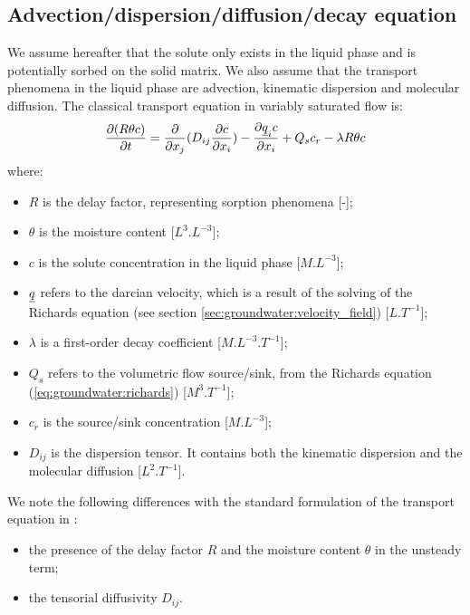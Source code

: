 \subsection{Advection/dispersion/diffusion/decay equation}
\hypertarget{gwf_sp_transp}{}
We assume hereafter that the solute only exists in the liquid phase and is
potentially sorbed on the solid matrix.
We also assume that the transport phenomena in the liquid phase are advection, kinematic dispersion and molecular diffusion.
The classical transport equation in variably saturated flow is:
\begin{equation}
\label{eq:groundwater:edv_disp_diff_ini}
\frac{\partial(R \theta c)}{\partial{t}}=\frac{\partial}{\partial x_j}(D_{ij} \frac{\partial c}{\partial x_i})-\frac{\partial \underline{q}_i c}{\partial x_i} + Q_s c_r - \lambda R \theta c
\end{equation}
where:
\begin {itemize}
 \item[$\bullet$] $R$ is the delay factor, representing sorption phenomena [-];
 \item[$\bullet$] $\theta$ is the moisture content [$L^3.L^{-3}$];
 \item[$\bullet$] $c$ is the solute concentration in the liquid phase [$M.L^{-3}$];
 \item[$\bullet$] $\underline{q}$ refers to the darcian velocity, which is a result of the solving of the Richards equation (see section \ref{sec:groundwater:velocity_field}) [$L.T^{-1}$];
 \item[$\bullet$] $\lambda$ is a first-order decay coefficient [$M.L^{-3}.T^{-1}$];
 \item[$\bullet$] $Q_s$ refers to the volumetric flow source/sink, from the Richards equation (\ref{eq:groundwater:richards}) [$M^3.T^{-1}$];
 \item[$\bullet$] $c_r$ is the source/sink concentration [$M.L^{-3}$];
 \item[$\bullet$] $D_{ij}$ is the dispersion tensor. It contains both the kinematic dispersion and the molecular diffusion [$L^2.T^{-1}$].
\end{itemize}
We note the following differences with the standard formulation of the transport equation in \CS:
\begin {itemize}
 \item[$\bullet$] the presence of the delay factor $R$ and the moisture content $\theta$ in the unsteady term;
 \item[$\bullet$] the tensorial diffusivity $D_{ij}$.
\end{itemize}


